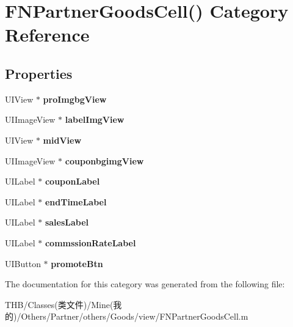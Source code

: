 \hypertarget{category_f_n_partner_goods_cell_07_08}{}\section{F\+N\+Partner\+Goods\+Cell() Category Reference}
\label{category_f_n_partner_goods_cell_07_08}
\subsection*{Properties}
\begin{DoxyCompactItemize}
\item 
\mbox{\label{category_f_n_partner_goods_cell_07_08_af463334275553896246215ebca85eb6e}} 
U\+I\+View $\ast$ {\bfseries pro\+Imgbg\+View}
\item 
\mbox{\label{category_f_n_partner_goods_cell_07_08_aca294fd88fa6ccd168d4b79c1f53328b}} 
U\+I\+Image\+View $\ast$ {\bfseries label\+Img\+View}
\item 
\mbox{\label{category_f_n_partner_goods_cell_07_08_a9012c2a6534bceaffe3af5b387c83dde}} 
U\+I\+View $\ast$ {\bfseries mid\+View}
\item 
\mbox{\label{category_f_n_partner_goods_cell_07_08_a84e81184e461945603e363a58892c845}} 
U\+I\+Image\+View $\ast$ {\bfseries couponbgimg\+View}
\item 
\mbox{\label{category_f_n_partner_goods_cell_07_08_a941c3bc66aa37f9b134e6960cfb34b1d}} 
U\+I\+Label $\ast$ {\bfseries coupon\+Label}
\item 
\mbox{\label{category_f_n_partner_goods_cell_07_08_a62c8529926ddbaa7ad007e2624858569}} 
U\+I\+Label $\ast$ {\bfseries end\+Time\+Label}
\item 
\mbox{\label{category_f_n_partner_goods_cell_07_08_a88c3528c835e4ce0c55217828fd88eb8}} 
U\+I\+Label $\ast$ {\bfseries sales\+Label}
\item 
\mbox{\label{category_f_n_partner_goods_cell_07_08_a945ecf279de7452695e0847ca11f438b}} 
U\+I\+Label $\ast$ {\bfseries commssion\+Rate\+Label}
\item 
\mbox{\label{category_f_n_partner_goods_cell_07_08_abda2e734fd9a4eb460f77c0d7f15cec2}} 
U\+I\+Button $\ast$ {\bfseries promote\+Btn}
\end{DoxyCompactItemize}


The documentation for this category was generated from the following file\+:\begin{DoxyCompactItemize}
\item 
T\+H\+B/\+Classes(类文件)/\+Mine(我的)/\+Others/\+Partner/others/\+Goods/view/F\+N\+Partner\+Goods\+Cell.\+m\end{DoxyCompactItemize}
